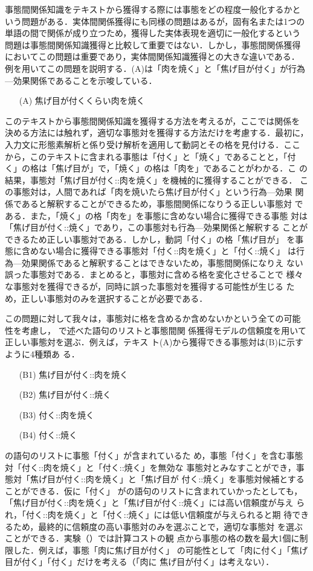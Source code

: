 \documentclass[japanese]{jnlp_1.4}
\begin{document}
事態間関係知識をテキストから獲得する際には事態をどの程度一般化するかと
いう問題がある．実体間関係獲得にも同様の問題はあるが，固有名または1つの
単語の間で関係が成り立つため，獲得した実体表現を適切に一般化するという
問題は事態間関係知識獲得と比較して重要ではない．しかし，事態間関係獲得
においてこの問題は重要であり，実体間関係知識獲得との大きな違いである．
例を用いてこの問題を説明する．(A)は「肉を焼く」と「焦げ目が付く」が行為
—効果関係であることを示唆している．
\begin{itemize}
\item[(A)] 焦げ目が付くくらい肉を焼く
\end{itemize}
このテキストから事態間関係知識を獲得する方法を考えるが，ここでは関係を
決める方法には触れず，適切な事態対を獲得する方法だけを考慮する．最初に，
入力文に形態素解析と係り受け解析を適用して動詞とその格を見付ける．ここ
から，このテキストに含まれる事態は「付く」と「焼く」であることと，「付
く」の格は「焦げ目が」で，「焼く」の格は「肉を」であることがわかる．こ
の結果，事態対「焦げ目が付く::肉を焼く」を機械的に獲得することができる．
この事態対は，人間であれば「肉を焼いたら焦げ目が付く」という行為—効果
関係であると解釈することができるため，事態間関係になりうる正しい事態対
である．また，「焼く」の格「肉を」を事態に含めない場合に獲得できる事態
対は「焦げ目が付く::焼く」であり，この事態対も行為—効果関係と解釈する
ことができるため正しい事態対である．しかし，動詞「付く」の格「焦げ目が」
を事態に含めない場合に獲得できる事態対「付く::肉を焼く」と「付く::焼く」
は行為—効果関係であると解釈することはできないため，事態間関係になりえ
ない誤った事態対である．まとめると，事態対に含める格を変化させることで
様々な事態対を獲得できるが，同時に誤った事態対を獲得する可能性が生じる
ため，正しい事態対のみを選択することが必要である．

この問題に対して我々は，事態対に格を含めるか含めないかという全ての可能
性を考慮し， で述べた語句のリストと事態間関
係獲得モデルの信頼度を用いて正しい事態対を選ぶ．例えば，テキス
ト(A)から獲得できる事態対は(B)に示すように4種類あ
る．
\begin{itemize}
\item[(B1)] 焦げ目が付く::肉を焼く
\item[(B2)] 焦げ目が付く::焼く
\item[(B3)] 付く::肉を焼く
\item[(B4)] 付く::焼く
\end{itemize}
の語句のリストに事態「付く」が含まれているた
め，事態「付く」を含む事態対「付く::肉を焼く」と「付く::焼く」を無効な
事態対とみなすことができ，事態対「焦げ目が付く::肉を焼く」と「焦げ目が
付く::焼く」を事態対候補とすることができる．仮に「付く」
がの語句のリストに含まれていかったとしても，
「焦げ目が付く::肉を焼く」と「焦げ目が付く::焼く」には高い信頼度が与え
られ，「付く::肉を焼く」と「付く::焼く」には低い信頼度が与えられると期
待できるため，最終的に信頼度の高い事態対のみを選ぶことで，適切な事態対
を選ぶことができる．実験（）では計算コストの観
点から事態の格の数を最大1個に制限した．例えば，事態「肉に焦げ目が付く」
の可能性として「肉に付く」「焦げ目が付く」「付く」だけを考える（「肉に
焦げ目が付く」は考えない）．
\end{document}

